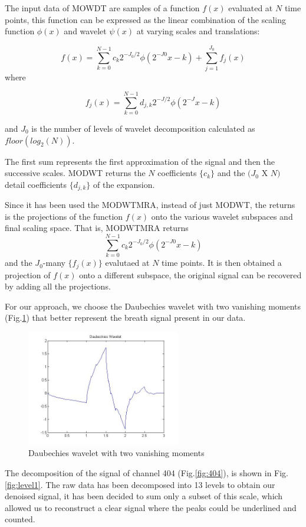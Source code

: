 The input data of MOWDT are samples of a function $f(x)$ evaluated at $N$ time points, this function can be expressed as the linear combination of the scaling function $\phi(x)$ and wavelet $\psi(x)$ at varying scales and translations:

$$f(x)=\sum_{k=0}^{N-1} c_k 2^{-J_0/2} \phi(2^{-J0}x-k) + \sum_{j=1}^{J_0}f_j(x)$$
where 

$$f_j(x)=\sum_{k=0}^{N-1} d_{j,k}2^{-J/2} \phi(2^{-J}x-k)$$

and $J_0$ is the number of levels of wavelet decomposition calculated as $floor(log_2(N))$.

The first sum represents the first approximation of the signal and then the successive scales.
MODWT returns the $N$ coefficients $\{c_k\}$ and the $(J_0 $ X $ N)$ detail coefficients $\{d_{j,k}\}$ of the expansion. 

Since it has been used the MODWTMRA, instead of just MODWT, the returns is the projections of the function $f(x)$ onto the various wavelet subspaces and final scaling space. That is, MODWTMRA returns 
$$\sum_{k=0}^{N-1} c_k 2^{-J_0/2} \phi(2^{-J0}x-k)$$\newline
and the $J_0$-many $\{f_j(x)\}$ evalutaed at $N$ time points.
It is then obtained a projection of $f(x)$ onto a different subspace, the original signal can be recovered by adding all the projections. 

For our approach, we choose the Daubechies wavelet with two vanishing moments (Fig.\ref{fig:Daubechies}) that better represent the breath signal present in our data.

\begin{figure}[h]
    \centering
    \includegraphics[width=0.6\textwidth]{img/gooddb.jpeg}
    \caption{Daubechies wavelet with two vanishing moments}
    \label{fig:Daubechies}
\end{figure}


The decomposition of the signal of channel 404 (Fig.\ref{fig:404}), is shown in Fig.\ref{fig:level1}. The raw data has been decomposed into 13 levels to obtain our denoised signal, it has been decided to sum only a subset of this scale, which allowed us to reconstruct a clear signal where the peaks could be underlined and counted. 

